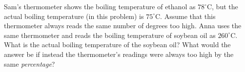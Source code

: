 Sam's thermometer shows the boiling temperature of ethanol as $78^\circ$C, but the actual boiling temperature (in this problem) is $75^\circ$C. Assume that this thermometer always reads the same number of degrees too high. Anna uses the same thermometer and reads the boiling temperature of soybean oil as $260^\circ$C. What is the actual boiling temperature of the soybean oil? What would the answer be if instead the thermometer's readings were always too high by the same \emph{percentage}?
